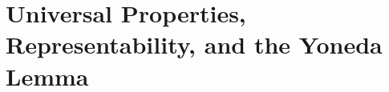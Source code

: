 \documentclass[main.tex]{subfiles}
\begin{document}
\chapter{Universal Properties, Representability, and the Yoneda Lemma}
% 
% 
% 
% 
\end{document}

